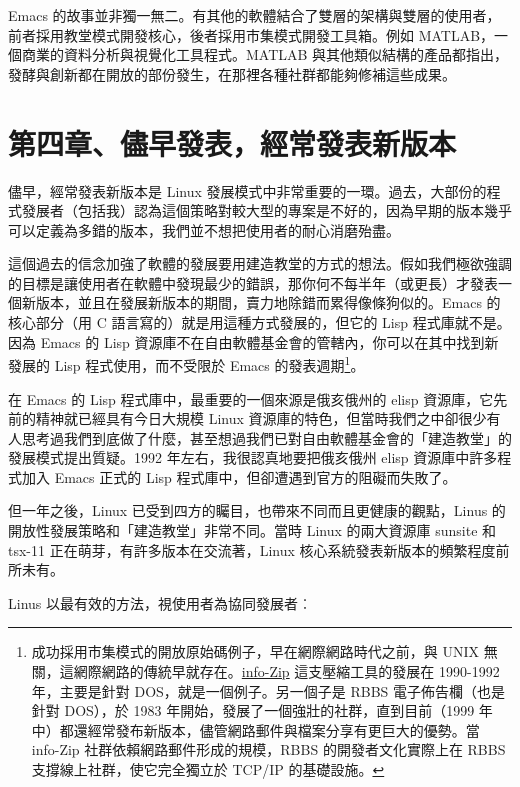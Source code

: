 \documentclass[12pt, a5paper]{book}
\begin{document}
Emacs
的故事並非獨一無二。有其他的軟體結合了雙層的架構與雙層的使用者，前者採用教堂模式開發核心，後者採用市集模式開發工具箱。例如
MATLAB，一個商業的資料分析與視覺化工具程式。MATLAB
與其他類似結構的產品都指出，發酵與創新都在開放的部份發生，在那裡各種社群都能夠修補這些成果。

\newpage
\section{第四章、儘早發表，經常發表新版本}\label{ux7b2cux56dbux7ae0ux5118ux65e9ux767cux8868ux7d93ux5e38ux767cux8868ux65b0ux7248ux672c}

儘早，經常發表新版本是 Linux
發展模式中非常重要的一環。過去，大部份的程式發展者（包括我）認為這個策略對較大型的專案是不好的，因為早期的版本幾乎可以定義為多錯的版本，我們並不想把使用者的耐心消磨殆盡。

這個過去的信念加強了軟體的發展要用建造教堂的方式的想法。假如我們極欲強調的目標是讓使用者在軟體中發現最少的錯誤，那你何不每半年（或更長）才發表一個新版本，並且在發展新版本的期間，賣力地除錯而累得像條狗似的。Emacs
的核心部分（用 C 語言寫的）就是用這種方式發展的，但它的 Lisp
程式庫就不是。因為 Emacs 的 Lisp
資源庫不在自由軟體基金會的管轄內，你可以在其中找到新發展的 Lisp
程式使用，而不受限於 Emacs 的發表週期\footnote{成功採用市集模式的開放原始碼例子，早在網際網路時代之前，與
  UNIX
  無關，這網際網路的傳統早就存在。\href{http://www.cdrom.com/pub/infozip/}{info-Zip}
  這支壓縮工具的發展在 1990-1992 年，主要是針對
  DOS，就是一個例子。另一個子是 RBBS 電子佈告欄（也是針對 DOS），於 1983
  年開始，發展了一個強壯的社群，直到目前（1999
  年中）都還經常發布新版本，儘管網路郵件與檔案分享有更巨大的優勢。當
  info-Zip 社群依賴網路郵件形成的規模，RBBS 的開發者文化實際上在 RBBS
  支撐線上社群，使它完全獨立於 TCP/IP 的基礎設施。}。

在 Emacs 的 Lisp 程式庫中，最重要的一個來源是俄亥俄州的 elisp
資源庫，它先前的精神就已經具有今日大規模 Linux
資源庫的特色，但當時我們之中卻很少有人思考過我們到底做了什麼，甚至想過我們已對自由軟體基金會的「建造教堂」的發展模式提出質疑。1992
年左右，我很認真地要把俄亥俄州 elisp 資源庫中許多程式加入 Emacs 正式的
Lisp 程式庫中，但卻遭遇到官方的阻礙而失敗了。

但一年之後，Linux 已受到四方的矚目，也帶來不同而且更健康的觀點，Linus
的開放性發展策略和「建造教堂」非常不同。當時 Linux 的兩大資源庫 sunsite
和 tsx-11 正在萌芽，有許多版本在交流著，Linux
核心系統發表新版本的頻繁程度前所未有。

Linus 以最有效的方法，視使用者為協同發展者︰
\end{document}
